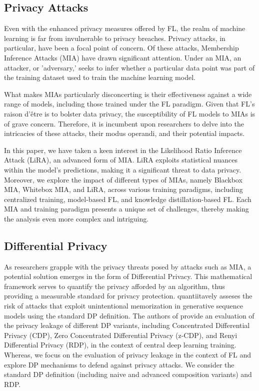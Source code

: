 \subsection{Privacy Attacks}

Even with the enhanced privacy measures offered by FL, the realm of machine learning is far from invulnerable to privacy breaches. Privacy attacks, in particular, have been a focal point of concern. Of these attacks, Membership Inference Attacks (MIA) have drawn significant attention. Under an MIA, an attacker, or 'adversary,' seeks to infer whether a particular data point was part of the training dataset used to train the machine learning model.

What makes MIAs particularly disconcerting is their effectiveness against a wide range of models, including those trained under the FL paradigm. Given that FL’s raison d'être is to bolster data privacy, the susceptibility of FL models to MIAs is of grave concern. Therefore, it is incumbent upon researchers to delve into the intricacies of these attacks, their modus operandi, and their potential impacts.

In this paper, we have taken a keen interest in the Likelihood Ratio Inference Attack (LiRA), an advanced form of MIA. LiRA exploits statistical nuances within the model's predictions, making it a significant threat to data privacy. Moreover, we explore the impact of different types of MIAs, namely Blackbox MIA, Whitebox MIA, and LiRA, across various training paradigms, including centralized training, model-based FL, and knowledge distillation-based FL. Each MIA and training paradigm presents a unique set of challenges, thereby making the analysis even more complex and intriguing.

\subsection{Differential Privacy}

As researchers grapple with the privacy threats posed by attacks such as MIA, a potential solution emerges in the form of Differential Privacy. This mathematical framework serves to quantify the privacy afforded by an algorithm, thus providing a measurable standard for privacy protection. \cite{carliniSecretSharerEvaluating2019} quantiitavely asseses the risk of attacks that exploit unintentional memorization in generative sequence models using the standard DP definition. The authors of \cite{EvaluatingDifferentiallyPrivate} provide an evaluation of the privacy leakage of different DP variants, including Concentrated Differential Privacy (CDP), Zero Concentrated Differential Privacy (z-CDP), and Renyi Differential Privacy (RDP), in the context of central deep learning training. Whereas, we focus on the evaluation of privacy leakage in the context of FL and explore DP mechanisms to defend against privacy attacks. We consider the standard DP definition (including naive and advanced composition variants) and RDP.

